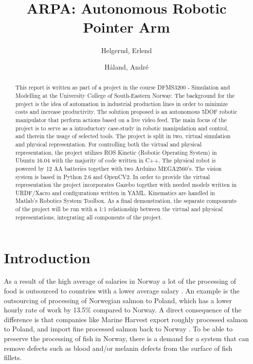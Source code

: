 \documentclass[11pt,a4paper, titlepage]{article}
\title{ARPA: Autonomous Robotic Pointer Arm}
\author{Helgerud, Erlend \and Håland, André}
\begin{document}
	\setlength\parindent{0pt}
	\setlength\parskip{10pt}
	\headheight
	\setlength{15pt}{}
	\footskip
	\setlength{33pt}{}
	\setcounter{secnumdepth}{4}
	\maketitle
	
\begin{abstract}
This report is written as part of a project in the course DFMS3200 - Simulation and Modelling at the University College of South-Eastern Norway. The background for the project is the idea of automation in industrial production lines in order to minimize costs and increase productivity. The solution proposed is an autonomous 5DOF robotic manipulator that perform actions based on a live video feed. The main focus of the project is to serve as a introductory case-study in robotic manipulation and control, and therein the usage of selected tools. The project is split in two, virtual simulation and physical representation. For controlling both the virtual and physical representation, the project utilizes ROS Kinetic (Robotic Operating System) in Ubuntu 16.04 with the majority of code written in C++. The physical robot is powered by 12 AA batteries together with two Arduino MEGA2560's. The vision system is based in Python 2.6 and OpenCV2. In order to provide the virtual representation the project incorporates Gazebo together with needed models written in URDF/Xacro and configurations written in YAML. Kinematics are handled in Matlab's Robotics System Toolbox. As a final demonstration, the separate components of the project will be run with a 1:1 relationship between the virtual and physical representations, integrating all components of the project.
\end{abstract}
	
	\tableofcontents
	\newpage

\section{Introduction}
As a result of the high average of salaries in Norway a lot of the processing of food is outsourced to countries with a lower average salary \cite{berge2015}. An example is the outsourcing of processing of Norwegian salmon to Poland, which has a lower hourly rate of work by 13.5\% compared to Norway. A direct consequence of the difference is that companies like Marine Harvest export roughly processed salmon to Poland, and import fine processed salmon back to Norway \cite{digre2014}. To be able to preserve the processing of fish in Norway, there is a demand for a system that can remove defects such as blood and/or melanin defects from the surface of fish fillets.
\end{document}
